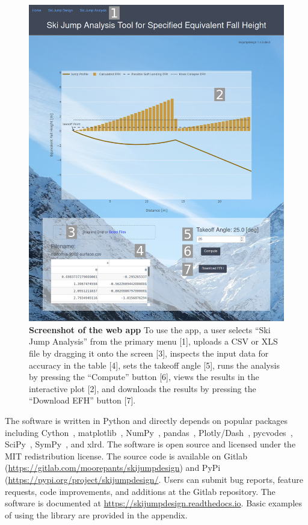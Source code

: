 \documentclass{article}
\begin{document}
\begin{figure}
  \centering
  \includegraphics[width=5.00in]{figures/web-app-screenshot.png}
  \caption{\textbf{Screenshot of the web app} To use the app, a user selects
    ``Ski Jump Analysis'' from the primary menu [1], uploads a CSV or XLS file
    by dragging it onto the screen [3], inspects the input data for accuracy in
    the table [4], sets the takeoff angle [5], runs the analysis by pressing
    the ``Compute'' button [6], views the results in the interactive plot [2],
    and downloads the results by pressing the ``Download EFH'' button [7].}
  \label{fig:web-app-screenshot}
\end{figure}

The software is written in Python and directly depends on popular packages
including Cython~\cite{Behnel2011}, matplotlib~\cite{Hunter2007},
NumPy~\cite{Oliphant2006}, pandas~\cite{McKinney2020},
Plotly/Dash~\cite{Plotly2015}, pycvodes~\cite{Dahlgren2018},
SciPy~\cite{Virtanen2020}, SymPy~\cite{Meurer2017}, and xlrd.  The software is
open source and licensed under the MIT redistribution license.  The source code
is available on Gitlab (\url{https://gitlab.com/moorepants/skijumpdesign}) and
PyPi (\url{https://pypi.org/project/skijumpdesign/}. Users can submit bug
reports, feature requests, code improvements, and additions at the Gitlab
repository. The software is documented at
\href{https://skijumpdesign.readthedocs.io}{https://skijumpdesign.readthedocs.io}.
Basic examples of using the library are provided in the appendix.
\end{document}
